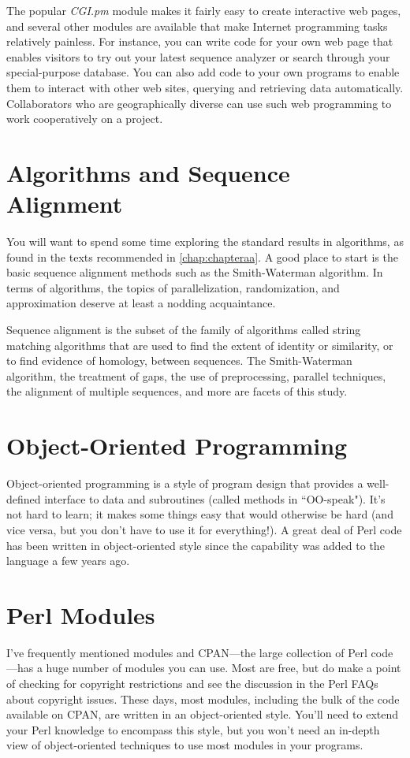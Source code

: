 The popular \textit{CGI.pm} module makes it fairly easy to create interactive web pages, and several other modules are available that make Internet programming tasks relatively painless. For instance, you can write code for your own web page that enables visitors to try out your latest sequence analyzer or search through your special-purpose database. You can also add code to your own programs to enable them to interact with other web sites, querying and retrieving data automatically. Collaborators who are geographically diverse can use such web programming to work cooperatively on a project.

\section{Algorithms and Sequence Alignment}
You will want to spend some time exploring the standard results in algorithms, as found in the texts recommended in \autoref{chap:chapteraa}. A good place to start is the basic sequence alignment methods such as the Smith-Waterman algorithm. In terms of algorithms, the topics of parallelization, randomization, and approximation deserve at least a nodding acquaintance.

Sequence alignment is the subset of the family of algorithms called string matching algorithms that are used to find the extent of identity or similarity, or to find evidence of homology, between sequences. The Smith-Waterman algorithm, the treatment of gaps, the use of preprocessing, parallel techniques, the alignment of multiple sequences, and more are facets of this study.

\section{Object-Oriented Programming}
Object-oriented programming is a style of program design that provides a well-defined interface to data and subroutines (called methods in ``OO-speak"). It's not hard to learn; it makes some things easy that would otherwise be hard (and vice versa, but you don't have to use it for everything!). A great deal of Perl code has been written in object-oriented style since the capability was added to the language a few years ago.

\section{Perl Modules}
I've frequently mentioned modules and CPAN—the large collection of Perl code—has a huge number of modules you can use. Most are free, but do make a point of checking for copyright restrictions and see the discussion in the Perl FAQs about copyright issues. These days, most modules, including the bulk of the code available on CPAN, are written in an object-oriented style. You'll need to extend your Perl knowledge to encompass this style, but you won't need an in-depth view of object-oriented techniques to use most modules in your programs.

